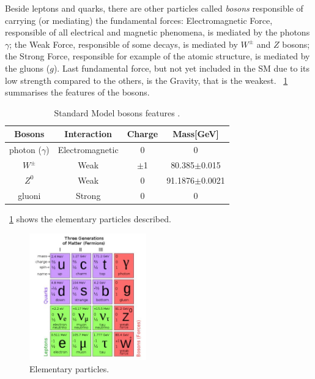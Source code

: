 Beside leptons and quarks, there are other particles called \textit{bosons} responsible of carrying (or mediating) the fundamental forces: Electromagnetic Force, responsible of all electrical and magnetic phenomena, is mediated by the photons {$\gamma$}; the Weak Force, responsible of some decays, is mediated by $W^{\pm}$ and $Z$ bosons; the Strong Force, responsible for example of the atomic structure, is mediated by the gluons ($g$). Last fundamental force, but not yet included in the SM due to its low strength compared to the others, is the Gravity, that is the weakest. \tablename~\ref{bosonsSM} summarises the features of the bosons.
\begin{table}[htbp]	
	\begin{center}
		\begin{tabular}{|cccc|}
			\hline    Bosons & Interaction & Charge & Mass[GeV]  \\
			\hline
			\hline
			 photon ($\gamma$) &  Electromagnetic & 0 & 0   \\
			 \hline
			 $W^{\pm}$ & Weak & $\pm$1 & 80.385$\pm$0.015   \\
			 \hline 
             	 	 $Z^{0}$ & Weak & 0 & 91.1876$\pm$0.0021   \\
			 \hline
			 gluoni & Strong & 0 & 0 \\
			\hline
			\hline
		\end{tabular}
	\end{center}
	\caption{Standard Model bosons features \cite{PDG}.}
	\label{bosonsSM}
\end{table}
\figurename~\ref{SM_zoo} shows the elementary particles described.
\begin{figure}[htbp]
\centering
\includegraphics[width=0.45\textwidth]{Images/SM_zoo}
\caption{Elementary particles. }
\label{SM_zoo}
\end{figure}

